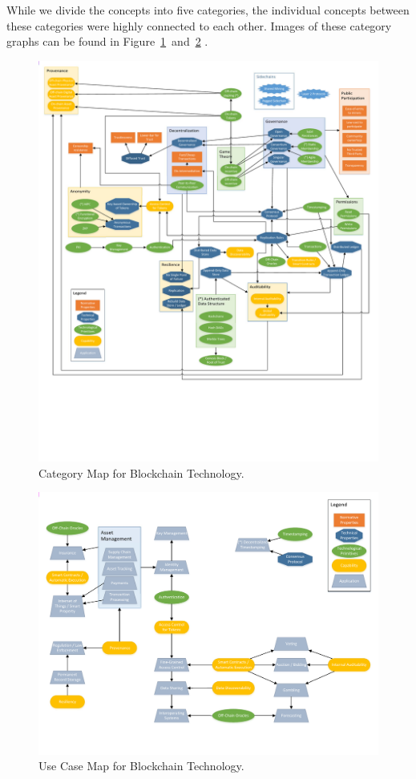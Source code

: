 While we divide the concepts into five categories, the individual concepts between these categories were highly connected to each other.
Images of these category graphs can be found in Figure~\ref{fig:grounded-theory-main}~and~\ref{fig:grounded-theory-apps} .

\begin{figure}
	\includegraphics[width=\textwidth]{figures/grounded-theory-main}
	\caption{Category Map for Blockchain Technology.}
	\label{fig:grounded-theory-main}
\end{figure}

\begin{figure}
	\includegraphics[width=\textwidth]{figures/grounded-theory-apps}
	\caption{Use Case Map for Blockchain Technology.}
	\label{fig:grounded-theory-apps}
\end{figure}

